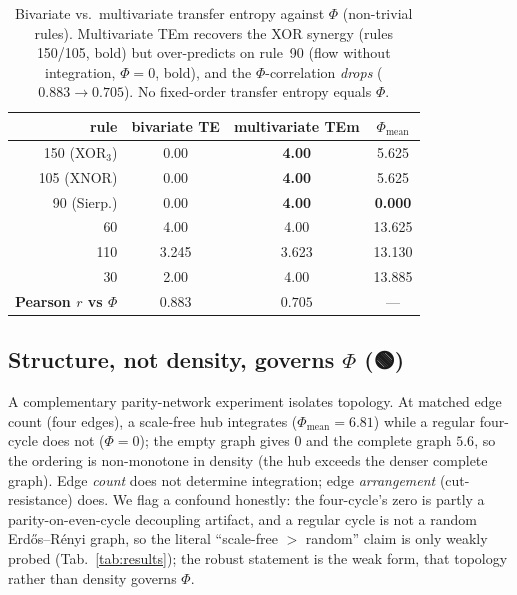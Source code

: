 \documentclass[11pt,a4paper]{article}
\providecommand{\tierGreen}{🟢}
\newcommand{\bigphi}{\ensuremath{\Phi}}
\begin{document}
\begin{table}[h]
\centering
\small
\begin{tabular}{r ccc}
\toprule
\textbf{rule} & \textbf{bivariate TE} & \textbf{multivariate TEm} & \(\bigphi_\mathrm{mean}\) \\
\midrule
150 (XOR$_3$) & 0.00 & \textbf{4.00} & 5.625 \\
105 (XNOR)    & 0.00 & \textbf{4.00} & 5.625 \\
90  (Sierp.)  & 0.00 & \textbf{4.00} & \textbf{0.000} \\
60            & 4.00 & 4.00 & 13.625 \\
110           & 3.245 & 3.623 & 13.130 \\
30            & 2.00 & 4.00 & 13.885 \\
\midrule
\multicolumn{1}{r}{\textbf{Pearson \(r\) vs \bigphi{}}} & \(0.883\) & \(0.705\) & --- \\
\bottomrule
\end{tabular}
\caption{Bivariate vs.\ multivariate transfer entropy against \bigphi{}
(non-trivial rules). Multivariate TEm recovers the XOR synergy (rules
150/105, bold) but over-predicts on rule~90 (flow without integration,
\(\bigphi=0\), bold), and the \bigphi{}-correlation \emph{drops}
(\(0.883\!\to\!0.705\)). No fixed-order transfer entropy equals \bigphi{}.}
\label{tab:teorder}
\end{table}

\subsection{Structure, not density, governs \bigphi{} (\tierGreen)}
\label{sec:structure}

A complementary parity-network experiment isolates topology. At matched
edge count (four edges), a scale-free hub integrates
(\(\bigphi_\mathrm{mean}=6.81\)) while a regular four-cycle does not
(\(\bigphi=0\)); the empty graph gives \(0\) and the complete graph
\(5.6\), so the ordering is non-monotone in density (the hub exceeds the
denser complete graph). Edge \emph{count} does not determine integration;
edge \emph{arrangement} (cut-resistance) does. We flag a confound
honestly: the four-cycle's zero is partly a parity-on-even-cycle
decoupling artifact, and a regular cycle is not a random Erd\H{o}s--R\'enyi
graph, so the literal ``scale-free \(>\) random'' claim is only weakly
probed (Tab.~\ref{tab:results}); the robust statement is the weak form,
that topology rather than density governs \bigphi{}.
\end{document}
